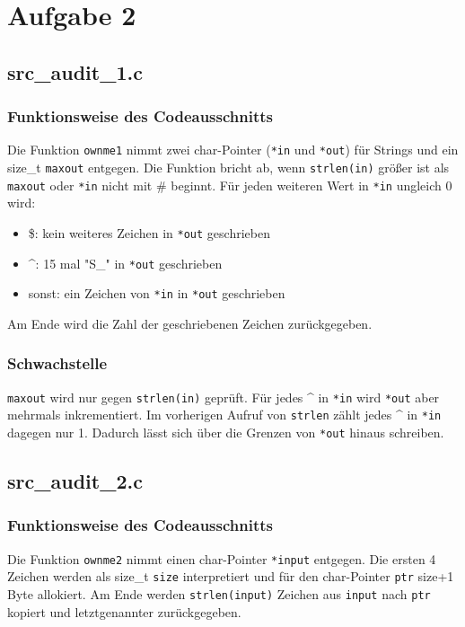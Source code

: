 \documentclass[11pt,a4paper]{article}
\begin{document}
\section{Aufgabe 2}
\subsection{src\_audit\_1.c}
\subsubsection{Funktionsweise des Codeausschnitts}
Die Funktion \texttt{ownme1} nimmt zwei char-Pointer (\texttt{*in} und \texttt{*out}) für Strings und ein size\_t \texttt{maxout} entgegen. Die Funktion bricht ab, wenn \texttt{strlen(in)} größer ist als \texttt{maxout} oder \texttt{*in} nicht mit \# beginnt. Für jeden weiteren Wert in \texttt{*in} ungleich 0 wird:
\begin{itemize}
\item \$: kein weiteres Zeichen in \texttt{*out} geschrieben
\item \^{}: 15 mal "S\_" in \texttt{*out} geschrieben
\item sonst: ein Zeichen von \texttt{*in} in \texttt{*out} geschrieben
\end{itemize}
Am Ende wird die Zahl der geschriebenen Zeichen zurückgegeben.
\subsubsection{Schwachstelle}
\texttt{maxout} wird nur gegen \texttt{strlen(in)} geprüft. Für jedes \^{} in \texttt{*in} wird \texttt{*out} aber mehrmals inkrementiert. Im vorherigen Aufruf von \texttt{strlen} zählt jedes \^{} in \texttt{*in} dagegen nur 1. Dadurch lässt sich über die Grenzen von \texttt{*out} hinaus schreiben. 
\subsection{src\_audit\_2.c}
\subsubsection{Funktionsweise des Codeausschnitts}
Die Funktion \texttt{ownme2} nimmt einen char-Pointer \texttt{*input} entgegen. Die ersten 4 Zeichen werden als size\_t \texttt{size} interpretiert und für den char-Pointer \texttt{ptr} size+1 Byte allokiert. Am Ende werden \texttt{strlen(input)} Zeichen aus \texttt{input} nach \texttt{ptr} kopiert und letztgenannter zurückgegeben.
\end{document}
